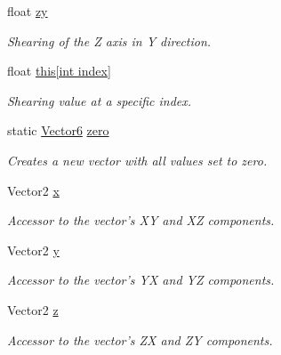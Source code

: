 \begin{DoxyCompactItemize}
float \hyperlink{class_grid_framework_1_1_vectors_1_1_vector6_a5e2ba27db4f2995d97dba42905370e50_a5e2ba27db4f2995d97dba42905370e50}{zy}
\begin{DoxyCompactList}\small\item\em Shearing of the {\itshape Z} axis in {\itshape Y} direction.\end{DoxyCompactList}\item 
float \hyperlink{class_grid_framework_1_1_vectors_1_1_vector6_ab808fc4113f5b68951005797070d72c1_ab808fc4113f5b68951005797070d72c1}{this\mbox{[}int index\mbox{]}}
\begin{DoxyCompactList}\small\item\em Shearing value at a specific index.\end{DoxyCompactList}\item 
static \hyperlink{class_grid_framework_1_1_vectors_1_1_vector6}{Vector6} \hyperlink{class_grid_framework_1_1_vectors_1_1_vector6_a3311412b06978ef40bba143664c3b534_a3311412b06978ef40bba143664c3b534}{zero}
\begin{DoxyCompactList}\small\item\em Creates a new vector with all values set to zero.\end{DoxyCompactList}\item 
Vector2 \hyperlink{class_grid_framework_1_1_vectors_1_1_vector6_a77bc405a8c8619997deb7c0f73c1775d_a77bc405a8c8619997deb7c0f73c1775d}{x}
\begin{DoxyCompactList}\small\item\em Accessor to the vector's {\itshape X\+Y} and {\itshape X\+Z} components.\end{DoxyCompactList}\item 
Vector2 \hyperlink{class_grid_framework_1_1_vectors_1_1_vector6_a0963b51adf39225727c205bb81234632_a0963b51adf39225727c205bb81234632}{y}
\begin{DoxyCompactList}\small\item\em Accessor to the vector's {\itshape Y\+X} and {\itshape Y\+Z} components.\end{DoxyCompactList}\item 
Vector2 \hyperlink{class_grid_framework_1_1_vectors_1_1_vector6_abe7ad3b6b88696850d22d90f46415c58_abe7ad3b6b88696850d22d90f46415c58}{z}
\begin{DoxyCompactList}\small\item\em Accessor to the vector's {\itshape Z\+X} and {\itshape Z\+Y} components.\end{DoxyCompactList}\end{DoxyCompactItemize}


